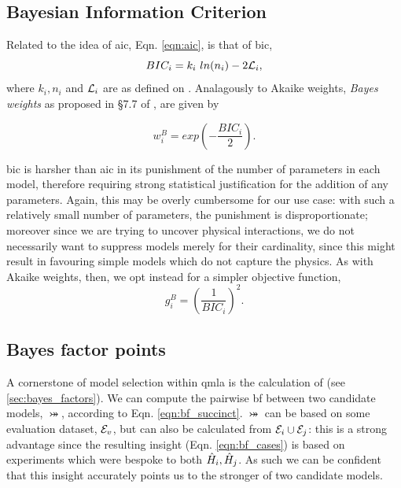 \par 

\subsection{Bayesian Information Criterion}\label{sec:bayes_info_criterion}
Related to the idea of \gls{aic}, Eqn. \ref{eqn:aic}, 
    is that of \gls{bic}, 
\begin{equation}
    \label{eqn:bic}
    BIC_i = k_i \ ln(n_i) - 2 {\mathcal{L}}_{i},
\end{equation}
    where $k_i, n_i$ and ${\mathcal{L}}_i$ are as defined on .
Analagously to Akaike weights, 
    \emph{Bayes weights} as proposed in \S7.7 of \cite{friedman2001elements}, are given by

\begin{equation}
    w_i^B = exp\left( - \frac{BIC_i}{2}  \right).
\end{equation}

\gls{bic} is harsher than \gls{aic} in its punishment of the number of parameters in each model, 
    therefore requiring strong statistical justification for the addition of any parameters. 
Again, this may be overly cumbersome for our use case:
    with such a relatively small number of parameters, 
    the punishment is disproportionate; 
    moreover since we are trying to uncover physical interactions, 
    we do not necessarily want to suppress models merely for 
    their cardinality, since this might result in favouring 
    simple models which do not capture the physics.  
As with Akaike weights, then, we opt instead for a simpler objective function,
\begin{equation}
    \label{eqn:bic_fitness}
    g_i^B = \left( \frac{1}{BIC_i}\right)^2.
\end{equation}
    

\subsection{Bayes factor points}\label{sec:bf_points}
A cornerstone of model selection within \gls{qmla} is the calculation of  (see \cref{sec:bayes_factors}). 
We can compute the pairwise \gls{bf} between two candidate models, $\bij$, according to Eqn. \ref{eqn:bf_succinct}.
$\bij$ can be based on some evaluation dataset, ${ \mathcal{E} }_v$, but can also be calculated from ${ \mathcal{E} }_i \cup { \mathcal{E} }_j$: 
    this is a strong advantage since the resulting insight (Eqn. \ref{eqn:bf_cases}) is based on 
    experiments which were bespoke to both $\hat{H}_i, \hat{H}_j$. 
As such we can be confident that this insight accurately points us to the stronger of two candidate models. 
\par 

